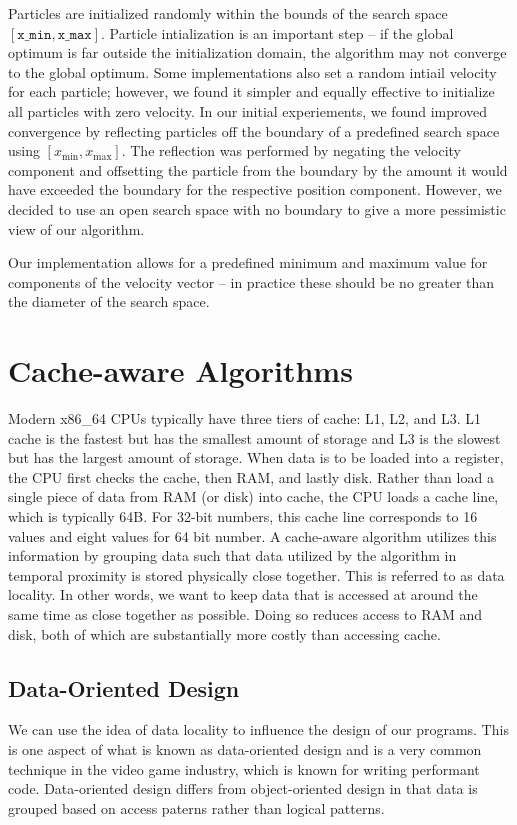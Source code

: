 Particles are initialized randomly within the bounds of the search space
$[\texttt{x\_min}, \texttt{x\_max}]$. Particle intialization is an important
step -- if the global optimum is far outside the initialization domain, the
algorithm may not converge to the global optimum.
Some implementations also set a random
intiail velocity for each particle; however, we found it simpler and equally
effective to initialize all particles with zero velocity. In our initial
experiements, we found improved convergence by reflecting particles off the
boundary of a predefined search space using $[x_{\min}, x_{\max}]$. The
reflection was performed by negating the velocity component and offsetting the
particle from the boundary by the amount it would have exceeded the boundary for
the respective position component.
However, we decided to use an open search space with no boundary to give a more
pessimistic view of our algorithm.

Our implementation allows for a predefined minimum and maximum value for
components of the velocity vector -- in practice these should be no greater than
the diameter of the search space.


\section{Cache-aware Algorithms}\label{sec:cache}
Modern x86\_64 CPUs typically have three tiers of cache: L1, L2, and
L3. L1 cache is the fastest but has the smallest amount of storage and L3 is the
slowest but has the largest amount of storage.
When data is to be loaded into a register, the CPU first checks the
cache, then RAM, and lastly disk. Rather than load a single piece of data from
RAM (or disk) into cache, the CPU loads a cache line, which is typically
64B. For 32-bit numbers, this cache line corresponds to 16 values and eight
values for 64 bit number.
A cache-aware
algorithm utilizes this information by grouping data such that data utilized by
the algorithm in temporal proximity is stored physically close together. This
is referred to as data locality. In other words, we want to keep data that is
accessed at around the same time as close together as possible. Doing so reduces
access to RAM and disk, both of which are substantially more
costly than accessing cache.

\subsection{Data-Oriented Design}
We can use the idea of data locality to
influence the design of our programs. This is one aspect of what is known as
data-oriented design and
is a very common technique in the video game industry, which is known for
writing performant code.
Data-oriented design
differs from object-oriented design in that data is grouped based on access
paterns rather than logical patterns.

